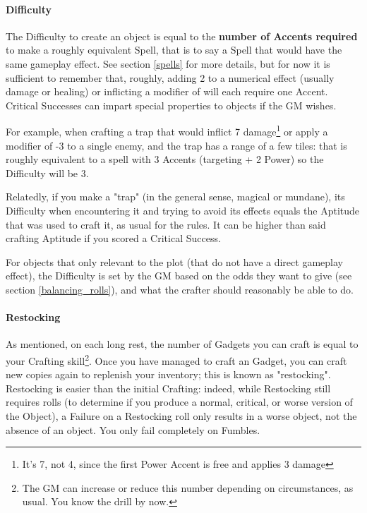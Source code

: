 \paragraph{Difficulty} 

The Difficulty to create an object is equal to the \textbf{number of Accents required} to make a roughly equivalent Spell, that is to say a Spell that would have the same gameplay effect. See section \ref{spells} for more details, but for now it is sufficient to remember that, roughly, adding 2 to a numerical effect (usually damage or healing) or inflicting a modifier of  will each require one Accent. Critical Successes can impart special properties to objects if the GM wishes.

For example, when crafting a trap that would inflict 7 damage\footnote{It's 7, not 4, since the first Power Accent is free and applies 3 damage} or apply a modifier of -3 to a single enemy, and the trap has a range of a few tiles: that is roughly equivalent to a spell with 3 Accents (targeting + 2 Power) so the Difficulty will be 3.

Relatedly, if you make a "trap" (in the general sense, magical or mundane), its Difficulty when encountering it and trying to avoid its effects equals the Aptitude that was used to craft it, as usual for the rules. It can be higher than said crafting Aptitude if you scored a Critical Success. 

For objects that only relevant to the plot (that do not have a direct gameplay effect), the Difficulty is set by the GM based on the odds they want to give (see section \ref{balancing_rolls}), and what the crafter should reasonably be able to do. 

\paragraph{Restocking}

As mentioned, on each long rest, the number of Gadgets you can craft is equal to your Crafting skill\footnote{The GM can increase or reduce this number depending on circumstances, as usual. You know the drill by now.}. Once you have managed to craft an Gadget, you can craft new copies again to replenish your inventory; this is known as "restocking". Restocking is easier than the initial Crafting: indeed, while Restocking still requires rolls (to determine if you produce a normal, critical, or worse version of the Object), a Failure on a Restocking roll only results in a worse object, not the absence of an object. You only fail completely on Fumbles.

